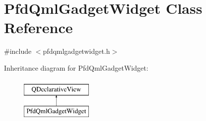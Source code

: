 \hypertarget{class_pfd_qml_gadget_widget}{\section{Pfd\-Qml\-Gadget\-Widget Class Reference}
\label{class_pfd_qml_gadget_widget}
}


{\ttfamily \#include $<$pfdqmlgadgetwidget.\-h$>$}

Inheritance diagram for Pfd\-Qml\-Gadget\-Widget\-:\begin{figure}[H]
\begin{center}
\leavevmode
\includegraphics[height=2.000000cm]{class_pfd_qml_gadget_widget}
\end{center}
\end{figure}
